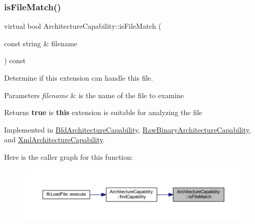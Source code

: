 \subsubsection{\texorpdfstring{isFileMatch()}{isFileMatch()}}
{\footnotesize\ttfamily virtual bool Architecture\+Capability\+::is\+File\+Match (\begin{DoxyParamCaption}\item[{const string \&}]{filename }\end{DoxyParamCaption}) const\hspace{0.3cm}{\ttfamily [pure virtual]}}



Determine if this extension can handle this file. 


\begin{DoxyParams}{Parameters}
{\em filename} & is the name of the file to examine \\
\hline
\end{DoxyParams}
\begin{DoxyReturn}{Returns}
{\bfseries{true}} is {\bfseries{this}} extension is suitable for analyzing the file 
\end{DoxyReturn}


Implemented in \mbox{\hyperlink{class_bfd_architecture_capability_a0191dabc12d97b8c5fc0ba14392077b1}{Bfd\+Architecture\+Capability}}, \mbox{\hyperlink{class_raw_binary_architecture_capability_aef426ad157b2f6b9130159322e2a2465}{Raw\+Binary\+Architecture\+Capability}}, and \mbox{\hyperlink{class_xml_architecture_capability_a90009c1feff64b66e29562b68b5f2a5a}{Xml\+Architecture\+Capability}}.

Here is the caller graph for this function\+:
\nopagebreak
\begin{figure}[H]
\begin{center}
\leavevmode
\includegraphics[width=350pt]{class_architecture_capability_aa3d4fed15e42f3e853851babaf379376_icgraph}
\end{center}
\end{figure}
\mbox{\label{class_architecture_capability_a653243b342d480273e0f04f7194094b8}} 
